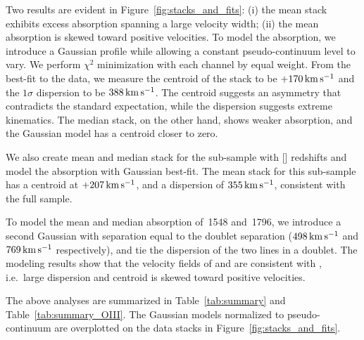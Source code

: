 \documentclass[iop]{emulateapj}
\begin{document}
Two results are evident in Figure~\ref{fig:stacks_and_fits}: (i) the mean  stack 
exhibits excess absorption spanning a large velocity width; (ii) the mean absorption is skewed 
toward positive velocities. To model the absorption, we introduce a Gaussian profile while 
allowing a constant pseudo-continuum level to vary. We perform $\chi^2$ minimization with each 
channel by equal weight. From the best-fit to the data, we measure the centroid of the  
stack to be $+170\,{\rm km\,s^{-1}}$ and the $1\sigma$ dispersion to be $388\,{\rm km\,s^{-1}}$. 
The centroid suggests an asymmetry that contradicts the standard expectation, while the dispersion 
suggests extreme kinematics. The median stack, on the other hand, shows weaker absorption, and the 
Gaussian model has a centroid closer to zero. 

We also create mean and median stack for the sub-sample with [] redshifts and model the 
absorption with Gaussian best-fit. The  mean stack for this sub-sample has a centroid at 
$+207\,{\rm km\,s^{-1}}$, and a dispersion of $355\,{\rm km\,s^{-1}}$, consistent with the full 
sample. 

To model the mean and median absorption of \,1548 and \,1796, we introduce a  
second Gaussian with separation equal to the doublet separation ($498\,{\rm km\,s^{-1}}$ and 
$769\,{\rm km\,s^{-1}}$ respectively), and tie the dispersion of the two lines in a doublet. The 
modeling results show that the velocity fields of  and  are consistent with 
, i.e.\ large dispersion and centroid is skewed toward positive velocities. 

The above analyses are summarized in Table~\ref{tab:summary} and Table~\ref{tab:summary_OIII}. The 
Gaussian models normalized to pseudo-continuum are overplotted on the data stacks in 
Figure~\ref{fig:stacks_and_fits}. 


%

%
\end{document}
